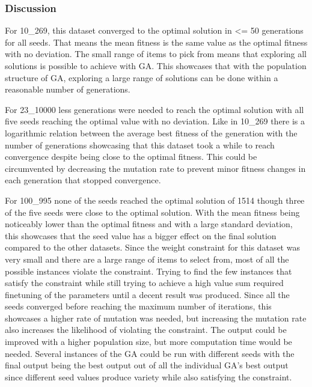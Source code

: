 \documentclass{article}
\begin{document}
\subsubsection*{Discussion}
For 10\_269, this dataset converged to the optimal solution in <= 50 generations for all seeds. That means the mean fitness is the same value as the optimal fitness with no deviation. The small range of items to pick from means that exploring all solutions is possible to achieve with GA. This showcases that with the population structure of GA, exploring a large range of solutions can be done within a reasonable number of generations. \par
\noindent For 23\_10000 less generations were needed to reach the optimal solution with all five seeds reaching the optimal value with no deviation. Like in 10\_269 there is a logarithmic relation between the average best fitness of the generation with the number of generations showcasing that this dataset took a while to reach convergence despite being close to the optimal fitness. This could be circumvented by decreasing the mutation rate to prevent minor fitness changes in each generation that stopped convergence. \par
\noindent For 100\_995 none of the seeds reached the optimal solution of 1514 though three of the five seeds were close to the optimal solution. With the mean fitness being noticeably lower than the optimal fitness and with a large standard deviation, this showcases that the seed value has a bigger effect on the final solution compared to the other datasets. Since the weight constraint for this dataset was very small and there are a large range of items to select from, most of all the possible instances violate the constraint. Trying to find the few instances that satisfy the constraint while still trying to achieve a high value sum required finetuning of the parameters until a decent result was produced. Since all the seeds converged before reaching the maximum number of iterations, this showcases a higher rate of mutation was needed, but increasing the mutation rate also increases the likelihood of violating the constraint. The output could be improved with a higher population size, but more computation time would be needed. Several instances of the GA could be run with different seeds with the final output being the best output out of all the individual GA’s best output since different seed values produce variety while also satisfying the constraint. \par
\end{document}
